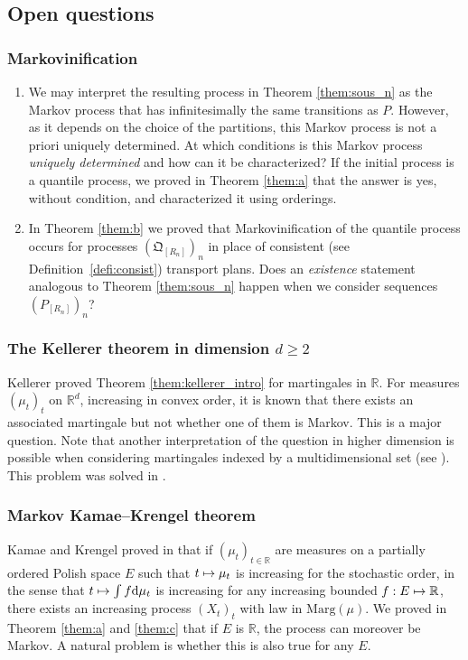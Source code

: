 \documentclass[11pt]{article}
\newcommand{\Subsection}{\subsection}
\newcommand{\Subsubsection}{\subsubsection}
\newcommand\mto{\mathchoice{\longmapsto}{\mapsto}{\mapsto}{\mapsto}}
\theoremstyle{plain}
\theoremstyle{definition}
\newcommand{\dd}{\mathrm{d}}
\newcommand{\como}{\mathfrak{Q}}
\newcommand{\ma}{\mathrm{Marg}}
\newcommand{\R}{\mathbb{R}}
\begin{document}
\Subsection{Open questions}

\Subsubsection{Markovinification}\label{ss:marko}
\begin{enumerate}
\item
We may interpret the resulting process in Theorem \ref{them:sous_n} as the Markov process that has infinitesimally the same transitions as $P$. However, as it depends on the choice of the partitions, this Markov process is not a priori uniquely determined. At which conditions is this Markov process \emph{uniquely determined} and how can it be characterized? If the initial process is a quantile process, we proved in Theorem \ref{them:a} that the answer is yes, without condition, and characterized it using orderings.

\item
In Theorem \ref{them:b} we proved that Markovinification of the quantile process occurs for processes $(\como_{[R_n]})_n$ in place of consistent (see Definition\ \ref{defi:consist}) transport plans. Does an \emph{existence} statement analogous to Theorem \ref{them:sous_n} happen when we consider sequences $(P_{[R_n]})_{n}$?\enlargethispage{.5\baselineskip}%
\end{enumerate}

\subsubsection{The Kellerer theorem in dimension $d\geq 2$}\label{ss:Kel_dimsup}
Kellerer proved Theorem \ref{them:kellerer_intro} for martingales in $\R$. For measures $(\mu_t)_t$ on $\R^d$, increasing in convex order, it is known that there exists an associated martingale \cite{HiRo13,BHS} but not whether one of them is Markov. This is a major question. Note that another interpretation of the question in higher dimension is possible when considering martingales indexed by a multidimensional set (see \cite[Prob.\,7b]{HPRY}). This problem was solved in \cite{Ju_seminaire}.

\subsubsection{Markov Kamae--Krengel theorem}\label{ss:marko_kk}
Kamae and Krengel proved in \cite{KaKr} that if $(\mu_t)_{t\in \R}$ are measures on a partially ordered Polish space $E$ such that $t\mto\mu_t$ is increasing for the stochastic order, in the sense that $t\mto \int f\dd\mu_t$ is increasing for any increasing bounded $f:E\mto \R$, there exists an increasing process $(X_t)_t$ with law in $\ma(\mu)$. We proved in Theorem \ref{them:a} and \ref{them:c} that if $E$ is $\R$, the process can moreover be Markov. A natural problem is whether this is also true for any $E$.
\end{document}
